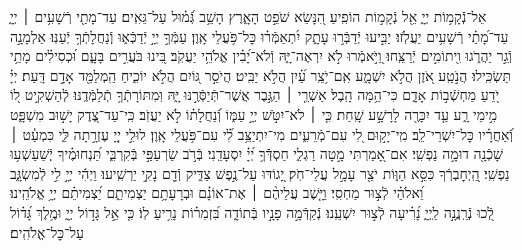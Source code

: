 \documentclass[twoside, openany, parskip=half, 11pt]{book}
\begin{document}
{
\begin{narrow}
אֵל־נְֿֿקָמ֥וֹת יְיָ֑ אֵ֖ל נְֿקָמ֣וֹת הוֹפִֽיעַ׃
הִ֭נָּשֵׂא שֹׁפֵ֣ט הָאָ֑רֶץ הָשֵׁ֥ב גְּֿ֝מ֗וּל עַל־גֵּאִֽים׃
עַד־מָתַ֖י רְֿשָׁעִ֥ים ׀ יְיָ֑  עַד־מָ֝תַ֗י רְֿשָׁעִ֥ים יַעֲלֹֽזוּ׃
יַבִּ֣יעוּ יְֿדַבְּֿר֣וּ עָתָ֑ק יִ֝תְאַמְּֿר֗וּ כׇּל־פֹּ֥עֲלֵי אָֽוֶן׃
עַמְּֿךָ֣ יְיָ֣ יְֿדַכְּֿא֑וּ וְֽֿנַחֲלָתְֿךָ֥ יְֿעַנּֽוּ׃
אַלְמָנָ֣ה וְֿגֵ֣ר יַהֲרֹ֑גוּ וִ֖יתוֹמִ֣ים יְֿרַצֵּֽחוּ׃
וַ֭יֹּ֣אמְֿרוּ לֹ֣א יִרְאֶה־יָּ֑הּ וְֿלֹא־יָ֝בִ֗ין אֱלֹהֵ֥י יַעֲקֹֽב׃
בִּ֭ינוּ בֹּעֲרִ֣ים בָּעָ֑ם וּ֝כְסִילִ֗ים מָתַ֥י תַּשְׂכִּֽילוּ׃
הֲנֹ֣טַֽע אֹ֭זֶן הֲלֹ֣א יִשְׁמָ֑ע אִֽם־יֹ֥צֵֽר עַ֗֝יִן הֲלֹ֣א יַבִּֽיט׃
הֲיֹסֵ֣ר גּ֭וֹיִם הֲלֹ֣א יוֹכִ֑יחַ הַֽמְלַמֵּ֖ד אָדָ֣ם דָּֽעַת׃
יְיָ֗ יֹ֭דֵעַ מַחְשְֿׁב֣וֹת אָדָ֑ם כִּי־הֵ֥מָּה הָֽבֶל׃
אַשְׁרֵ֤י ׀ הַגֶּ֣בֶר אֲשֶׁר־תְּֿיַסְּֿרֶ֣נּוּ יָּ֑הּ וּֽמִתּוֹרָתְֿךָ֥ תְֿלַמְּֿדֶֽנּוּ׃
לְֿהַשְׁקִ֣יט ל֭וֹ מִ֣ימֵי רָ֑ע עַ֤ד יִכָּרֶ֖ה לָרָשָׁ֣ע שָֽׁחַת׃
כִּ֤י ׀ לֹא־יִטֹּ֣שׁ יְיָ֣ עַמּ֑וֹ וְֿ֝נַחֲלָת֗וֹ לֹ֣א יַעֲזֹֽב׃
כִּֽי־עַד־צֶ֭דֶק יָשׁ֣וּב מִשְׁפָּ֑ט וְֿ֝אַחֲרָ֗יו כׇּל־יִשְׁרֵי־לֵֽב׃
מִֽי־יָק֣וּם לִ֭י עִם־מְֿרֵעִ֑ים מִי־יִתְיַצֵּ֥ב לִ֗֝י עִם־פֹּ֥עֲלֵי אָֽוֶן׃
לוּלֵ֣י יְיָ֭ עֶזְרָ֣תָה לִּ֑י כִּמְעַ֓ט ׀ שָׁכְֿנָ֖ה דוּמָ֣ה נַפְשִֽׁי׃
אִם־אָ֭מַרְתִּי מָ֣טָה רַגְלִ֑י חַסְדְּֿֿךָ֥ יְ֝יָ֗ יִסְעָדֵֽנִי׃
בְּֿרֹ֣ב שַׂרְעַפַּ֣י בְּֿקִרְבִּ֑י תַּ֝נְחוּמֶ֗יךָ יְֽֿשַׁעַשְׁע֥וּ נַפְשִֽׁי׃
הַֽ֭יְחׇבְרְֿךָ כִּסֵּ֣א הַוּ֑וֹת יֹצֵ֖ר עָמָ֣ל עֲלֵי־חֹֽק׃
יָ֭גוֹדּוּ עַל־נֶ֣פֶשׁ צַדִּ֑יק וְֿדָ֖ם נָקִ֣י יַרְשִֽׁיעוּ׃
וַיְהִ֬י יְיָ֣ לִ֣י לְֿמִשְׂגָּ֑ב וֵ֝אלֹהַ֗י לְֿצ֣וּר מַחְסִֽי׃
וַיָּ֤שֶׁב עֲלֵיהֶ֨ם ׀ אֶת־אוֹנָ֗ם וּבְרָעָתָ֥ם יַצְמִיתֵ֑ם יַ֝צְמִיתֵ֗ם יְיָ֥ אֱלֹהֵֽינוּ׃\\


לְֿ֭כוּ נְֿרַֽנֲנָ֣ה לַֽיְיָ֑ נָ֝רִ֗יעָה לְֿצ֣וּר יִשְׁעֵֽנוּ׃ נְֿקַדְּֿמָ֣ה פָנָ֣יו בְּֿתוֹדָ֑ה בִּ֝זְמִר֗וֹת נָרִ֥יעַ לֽוֹ׃ כִּ֤י אֵ֣ל גָּד֣וֹל יְיָ֑ וּמֶ֥לֶךְ גָּ֝ד֗וֹל עַל־כׇּל־אֱלֹהִֽים׃
\end{narrow}

}
\end{document}
